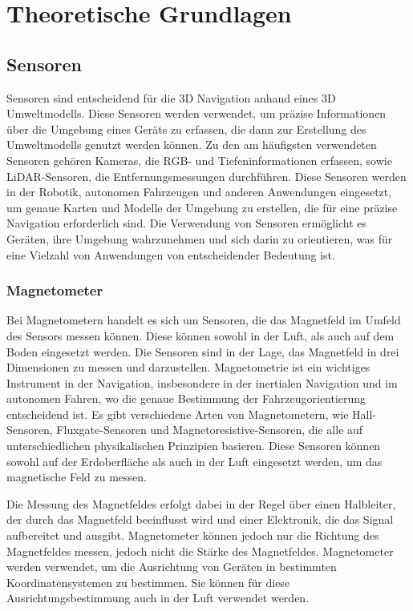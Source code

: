 \chapter{Theoretische Grundlagen}

\section{Sensoren} \label{sensoren:section}

Sensoren sind entscheidend für die 3D Navigation anhand eines 3D Umweltmodells. Diese Sensoren werden verwendet, um präzise Informationen über die Umgebung eines Geräts zu erfassen, die dann zur Erstellung des Umweltmodells genutzt werden können. Zu den am häufigsten verwendeten Sensoren gehören Kameras, die RGB- und Tiefeninformationen erfassen, sowie LiDAR-Sensoren, die Entfernungsmessungen durchführen. Diese Sensoren werden in der Robotik, autonomen Fahrzeugen und anderen Anwendungen eingesetzt, um genaue Karten und Modelle der Umgebung zu erstellen, die für eine präzise Navigation erforderlich sind. Die Verwendung von Sensoren ermöglicht es Geräten, ihre Umgebung wahrzunehmen und sich darin zu orientieren, was für eine Vielzahl von Anwendungen von entscheidender Bedeutung ist.

    \subsection{Magnetometer} \label{magnetometer:subsection}

    Bei Magnetometern handelt es sich um Sensoren, die das Magnetfeld im Umfeld des Sensors messen können.
    Diese können sowohl in der Luft, als auch auf dem Boden eingesetzt werden.
    Die Sensoren sind in der Lage, das Magnetfeld in drei Dimensionen zu messen und darzustellen.
    Magnetometrie ist ein wichtiges Instrument in der Navigation, insbesondere in der inertialen Navigation und im autonomen Fahren, wo die genaue Bestimmung der Fahrzeugorientierung entscheidend ist. Es gibt verschiedene Arten von Magnetometern, wie Hall-Sensoren, Fluxgate-Sensoren und Magnetoresistive-Sensoren, die alle auf unterschiedlichen physikalischen Prinzipien basieren. Diese Sensoren können sowohl auf der Erdoberfläche als auch in der Luft eingesetzt werden, um das magnetische Feld zu messen.

    Die Messung des Magnetfeldes erfolgt dabei in der Regel über einen Halbleiter, der durch das Magnetfeld beeinflusst wird und einer Elektronik, die das Signal aufbereitet und ausgibt.
    Magnetometer können jedoch nur die Richtung des Magnetfeldes messen, jedoch nicht die Stärke des Magnetfeldes.
    Magnetometer werden verwendet, um die Ausrichtung von Geräten in bestimmten Koordinatensystemen zu bestimmen.
    Sie können für diese Ausrichtungsbestimmung auch in der Luft verwendet werden. 
 
